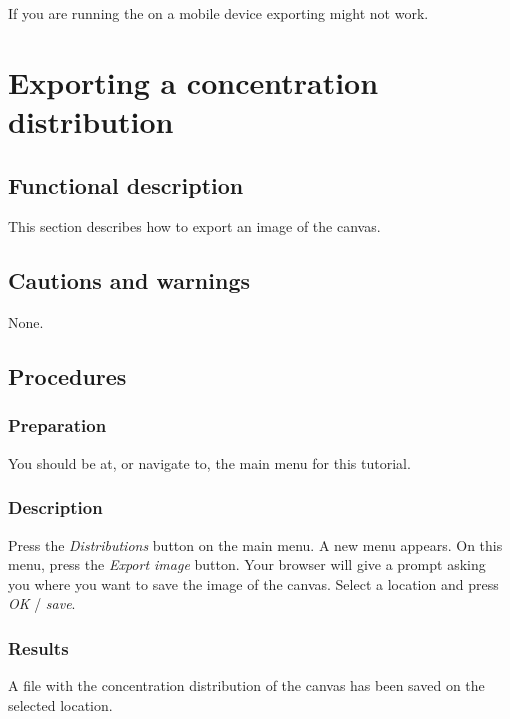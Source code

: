 If you are running the \applicationname on a mobile device exporting might not work.


\section{Exporting a concentration distribution}
\label{sec:exportDist}

\subsection{Functional description}
This section describes how to export an image of the canvas.

\subsection{Cautions and warnings}
None.

\subsection{Procedures}
\subsubsection{Preparation}
You should be at, or navigate to, the main menu for this tutorial.

\subsubsection{Description}
Press the \emph{Distributions} button on the main menu. A new menu appears. On this menu, press the \emph{Export image} button.  Your browser will give a prompt asking you where you want to save the image of the canvas. Select a location and press \emph{OK} / \emph{save}.

\subsubsection{Results}
A file with the concentration distribution of the canvas has been saved on the selected location.


